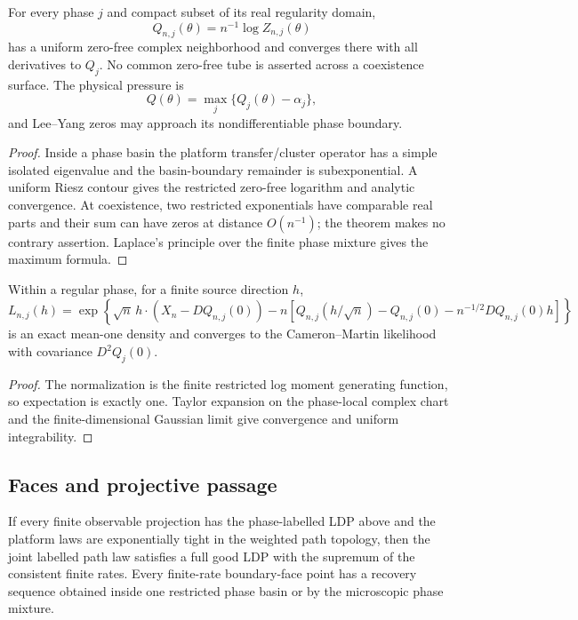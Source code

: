 \begin{theorem}
\label{thm:r10-d1-charts}
For every phase \(j\) and compact subset of its real regularity domain,
\[
 Q_{n,j}(\theta)=n^{-1}\log Z_{n,j}(\theta)
\]
has a uniform zero-free complex neighborhood and converges there with all
derivatives to \(Q_j\).  No common zero-free tube is asserted across a
coexistence surface.  The physical pressure is
\[
 Q(\theta)=\max_j\{Q_j(\theta)-\alpha_j\},
\]
and Lee--Yang zeros may approach its nondifferentiable phase boundary.
\end{theorem}

\begin{proof}
Inside a phase basin the platform transfer/cluster operator has a simple
isolated eigenvalue and the basin-boundary remainder is subexponential.  A
uniform Riesz contour gives the restricted zero-free logarithm and analytic
convergence.  At coexistence, two restricted exponentials have comparable
real parts and their sum can have zeros at distance \(O(n^{-1})\); the theorem
makes no contrary assertion.  Laplace's principle over the finite phase
mixture gives the maximum formula.
\end{proof}

\begin{corollary}
\label{cor:r10-d1-lan}
Within a regular phase, for a finite source direction \(h\),
\[
 L_{n,j}(h)=
 \exp\left\{
 \sqrt n\,h\cdot(X_n-DQ_{n,j}(0))
 -n[Q_{n,j}(h/\sqrt n)-Q_{n,j}(0)
     -n^{-1/2}DQ_{n,j}(0)h]
 \right\}
\]
is an exact mean-one density and converges to the Cameron--Martin likelihood
with covariance \(D^2Q_j(0)\).
\end{corollary}

\begin{proof}
The normalization is the finite restricted log moment generating function, so
expectation is exactly one.  Taylor expansion on the phase-local complex chart
and the finite-dimensional Gaussian limit give convergence and uniform
integrability.
\end{proof}

\subsection{Faces and projective passage}

\begin{theorem}
\label{thm:r10-d1-projective}
If every finite observable projection has the phase-labelled LDP above and the
platform laws are exponentially tight in the weighted path topology, then the
joint labelled path law satisfies a full good LDP with the supremum of the
consistent finite rates.  Every finite-rate boundary-face point has a recovery
sequence obtained inside one restricted phase basin or by the microscopic
phase mixture.
\end{theorem}


